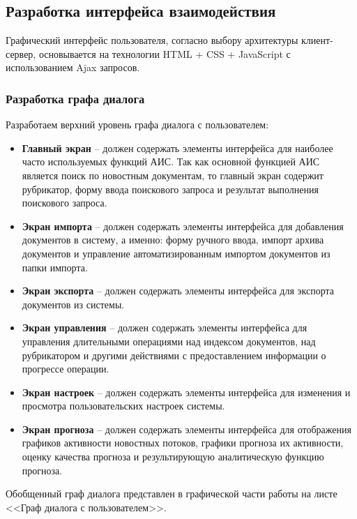 \subsection{Разработка интерфейса взаимодействия}

Графический интерфейс пользователя, согласно выбору архитектуры клиент-сервер, основывается на технологии HTML + CSS + JavaScript с использованием Ajax запросов. 

\subsubsection{Разработка графа диалога}

Разработаем верхний уровень графа диалога с пользователем:
\begin{itemize}
\item \textbf{Главный экран} -- должен содержать элементы интерфейса для наиболее часто используемых функций АИС. Так как основной функцией АИС является поиск по новостным документам, то главный экран содержит рубрикатор, форму ввода поискового запроса и результат выполнения поискового запроса.
\item \textbf{Экран импорта} -- должен содержать элементы интерфейса для добавления документов в систему, а именно: форму ручного ввода, импорт архива документов и управление автоматизированным импортом документов из папки импорта.
\item \textbf{Экран экспорта} -- должен содержать элементы интерфейса для экспорта документов из системы.
\item \textbf{Экран управления} -- должен содержать элементы интерфейса для управления длительными операциями над индексом документов, над рубрикатором и другими действиями с предоставлением информации о прогрессе операции.
\item \textbf{Экран настроек} -- должен содержать элементы интерфейса для изменения и просмотра пользовательских настроек системы.
\item \textbf{Экран прогноза} -- должен содержать элементы интерфейса для отображения графиков активности новостных потоков, графики прогноза их активности, оценку качества прогноза и результирующую аналитическую функцию прогноза.
\end{itemize}

Обобщенный граф диалога представлен в графической части работы на листе <<Граф диалога с пользователем>>. %



